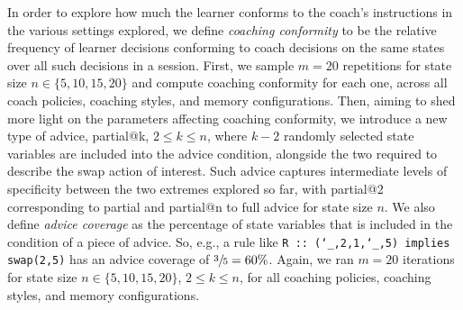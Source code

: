 \documentclass[runningheads]{llncs}
\makeatletter
\newcommand{\ttus}{\char`_}
\newcommand{\partialadvice}[1]{partial@{#1}}
\makeatother
\begin{document}
In order to explore how much the learner conforms to the coach's instructions in the various settings explored, we define \emph{coaching conformity} to be the relative frequency of learner decisions conforming to coach decisions on the same states over all such decisions in a session. First, we sample $m=20$ repetitions for state size $n\in\{5,10,15,20\}$ and compute coaching conformity for each one, across all coach policies, coaching styles, and memory configurations. Then, aiming to shed more light on the parameters affecting coaching conformity, we introduce a new type of advice, \partialadvice{k}, $2\leq k\leq n$, where $k-2$ randomly selected state variables are included into the advice condition, alongside the two required to describe the swap action of interest. Such advice captures intermediate levels of specificity between the two extremes explored so far, with \partialadvice{2} corresponding to partial and \partialadvice{n} to full advice for state size $n$. We also define \emph{advice coverage} as the percentage of state variables that is included in the condition of a piece of advice. So, e.g., a rule like \texttt{R ::~(\ttus,2,1,\ttus,5) implies swap(2,5)} has an advice coverage of $\sfrac{3}{5}=60\%$. Again, we ran $m=20$ iterations for state size $n\in\{5,10,15,20\}$, $2\leq k\leq n$, for all coaching policies, coaching styles, and memory configurations.
\end{document}
